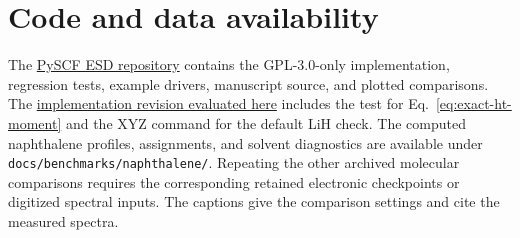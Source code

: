 \documentclass[11pt]{article}
\begin{document}
\section*{Code and data availability}

The \href{https://github.com/HenriqueCSJ/PySCF_ESD}{PySCF ESD repository} contains the GPL-3.0-only implementation, regression tests, example drivers, manuscript source, and plotted comparisons. The \href{https://github.com/HenriqueCSJ/PySCF_ESD/tree/49511495e1cf3cd60a4b861e2070251c5614f10d}{implementation revision evaluated here} includes the test for Eq.~\eqref{eq:exact-ht-moment} and the XYZ command for the default LiH check. The computed naphthalene profiles, assignments, and solvent diagnostics are available under \nolinkurl{docs/benchmarks/naphthalene/}. Repeating the other archived molecular comparisons requires the corresponding retained electronic checkpoints or digitized spectral inputs. The captions give the comparison settings and cite the measured spectra.
\end{document}
